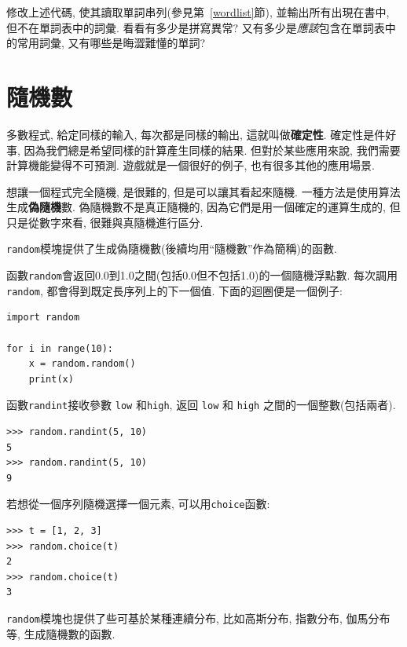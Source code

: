 \documentclass[10pt]{book}
\begin{document}
\begin{exercise}

修改上述代碼, 使其讀取單詞串列(參見第~\ref{wordlist}節), 
並輸出所有出現在書中, 但不在單詞表中的詞彙. 
看看有多少是拼寫異常? 又有多少是{\em 應該}包含在單詞表中的常用詞彙,
又有哪些是晦澀難懂的單詞?

\end{exercise}


\section{隨機數}

多數程式, 給定同樣的輸入, 每次都是同樣的輸出, 這就叫做{\bf 確定性}.
確定性是件好事, 因為我們總是希望同樣的計算產生同樣的結果. 
但對於某些應用來說, 我們需要計算機能變得不可預測. 
遊戲就是一個很好的例子, 也有很多其他的應用場景. 

想讓一個程式完全隨機, 是很難的, 但是可以讓其看起來隨機. 
一種方法是使用算法生成{\bf 偽隨機}數.
偽隨機數不是真正隨機的, 因為它們是用一個確定的運算生成的, 
但只是從數字來看, 很難與真隨機進行區分. 

{\tt random}模塊提供了生成偽隨機數(後續均用``隨機數''作為簡稱)的函數.

函數{\tt random}會返回0.0到1.0之間(包括0.0但不包括1.0)的一個隨機浮點數. 
每次調用{\tt random}, 都會得到既定長序列上的下一個值. 
下面的迴圈便是一個例子:

\begin{verbatim}
import random

for i in range(10):
    x = random.random()
    print(x)
\end{verbatim}
%
函數{\tt randint}接收參數 {\tt low} 和{\tt high}, 
返回 {\tt low} 和 {\tt high} 之間的一個整數(包括兩者). 

\begin{verbatim}
>>> random.randint(5, 10)
5
>>> random.randint(5, 10)
9
\end{verbatim}
%
若想從一個序列隨機選擇一個元素, 可以用{\tt choice}函數:

\begin{verbatim}
>>> t = [1, 2, 3]
>>> random.choice(t)
2
>>> random.choice(t)
3
\end{verbatim}
%
{\tt random}模塊也提供了些可基於某種連續分布, 
比如高斯分布, 指數分布, 伽馬分布等, 生成隨機數的函數. 
\end{document}
